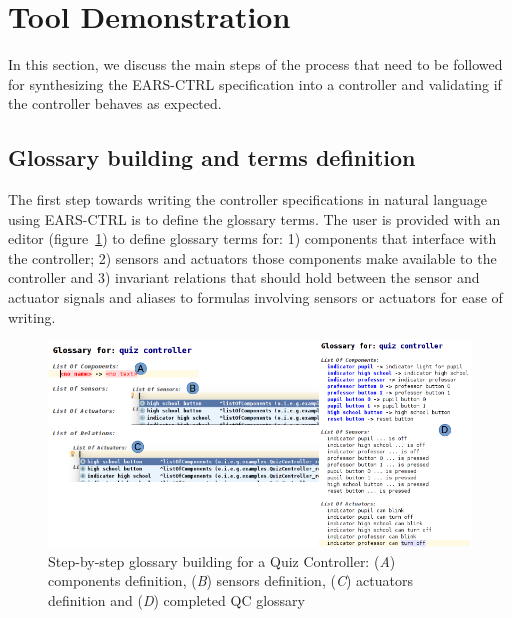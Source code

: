 \vspace{-.5cm}
\section{Tool Demonstration}
\label{sec:demo}
\vspace{-.3cm}
In this section, we discuss the main steps of the process that need to be
followed for synthesizing the EARS-CTRL specification into a controller and
validating if the controller behaves as expected.
\vspace{-.3cm}
\subsection{Glossary building and terms definition}
\vspace{-.2cm}
The first step towards writing the controller specifications in natural
language using \textsf{EARS-CTRL} is to define the glossary terms. 
The user is provided with an editor
(figure~\ref{fig:glossary_def}) to define glossary terms for:
1) components that interface with the controller; 2) sensors and actuators those
components make available to the controller and 3) invariant relations
that should hold between the sensor and actuator signals and aliases to
formulas involving sensors or actuators for ease of writing.
\vspace{-.2cm}
\begin{figure}[!h]
\centering
\includegraphics[width=1\textwidth]{./images/QC_Glossary_Def.png}
\caption{Step-by-step glossary building for a Quiz Controller: (\emph{A})
components definition, (\emph{B}) sensors definition, (\emph{C}) actuators
definition and (\emph{D}) completed QC glossary}
\label{fig:glossary_def}
\end{figure}
\vspace{-.2cm}
